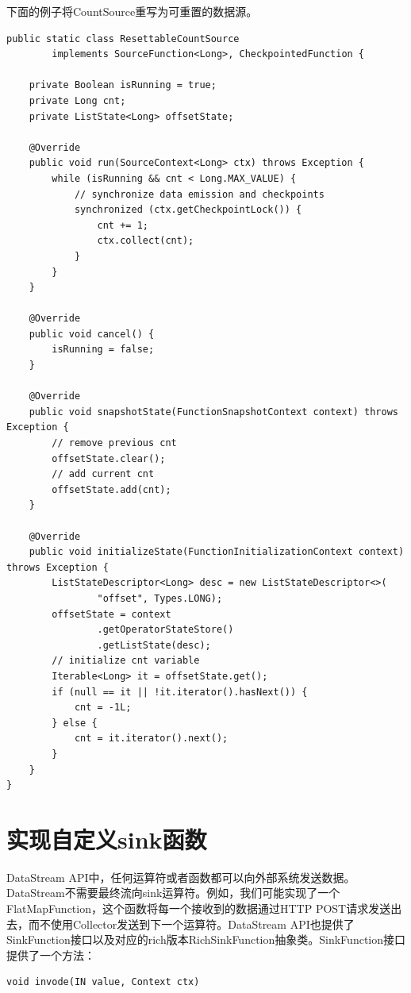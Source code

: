 \documentclass[cn,11pt,chinese]{elegantbook}
\begin{document}
下面的例子将CountSource重写为可重置的数据源。

\begin{verbatim}
public static class ResettableCountSource
        implements SourceFunction<Long>, CheckpointedFunction {

    private Boolean isRunning = true;
    private Long cnt;
    private ListState<Long> offsetState;

    @Override
    public void run(SourceContext<Long> ctx) throws Exception {
        while (isRunning && cnt < Long.MAX_VALUE) {
            // synchronize data emission and checkpoints
            synchronized (ctx.getCheckpointLock()) {
                cnt += 1;
                ctx.collect(cnt);
            }
        }
    }

    @Override
    public void cancel() {
        isRunning = false;
    }

    @Override
    public void snapshotState(FunctionSnapshotContext context) throws Exception {
        // remove previous cnt
        offsetState.clear();
        // add current cnt
        offsetState.add(cnt);
    }

    @Override
    public void initializeState(FunctionInitializationContext context) throws Exception {
        ListStateDescriptor<Long> desc = new ListStateDescriptor<>(
                "offset", Types.LONG);
        offsetState = context
                .getOperatorStateStore()
                .getListState(desc);
        // initialize cnt variable
        Iterable<Long> it = offsetState.get();
        if (null == it || !it.iterator().hasNext()) {
            cnt = -1L;
        } else {
            cnt = it.iterator().next();
        }
    }
}
\end{verbatim}

\section{实现自定义sink函数}

DataStream API中，任何运算符或者函数都可以向外部系统发送数据。DataStream不需要最终流向sink运算符。例如，我们可能实现了一个FlatMapFunction，这个函数将每一个接收到的数据通过HTTP POST请求发送出去，而不使用Collector发送到下一个运算符。DataStream API也提供了SinkFunction接口以及对应的rich版本RichSinkFunction抽象类。SinkFunction接口提供了一个方法：

\begin{verbatim}
void invode(IN value, Context ctx)
\end{verbatim}
\end{document}
